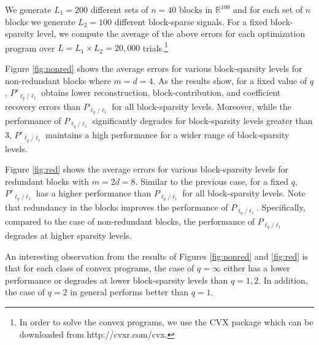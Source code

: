 \documentclass[10pt,twocolumn,twoside] {IEEEtran}
\begin{document}
{We generate $L_1 = 200$ different sets of $n = 40$ blocks in ${\mathbb{R}}^{100}$ and for each set of $n$ blocks we generate $L_2 = 100$ different block-sparse signals. For a fixed block-sparsity level, we compute the average of the above errors for each optimization program over $L = L_1 \times L_2 = 20,000$ trials.\footnote{In order to solve the convex programs, we use the CVX package which can be downloaded from http://cvxr.com/cvx.} 

Figure \ref{fig:nonred} shows the average errors for various block-sparsity levels for non-redundant blocks where $m = d = 4$. As the results show, for a fixed value of $q$, $P'_{\ell_q/\ell_1}$ obtains lower reconstruction, block-contribution, and coefficient recovery errors than $P_{\ell_q/\ell_1}$ for all block-sparsity levels. Moreover, while the performance of $P_{\ell_q/\ell_1}$ significantly degrades for block-sparsity levels greater than $3$, $P'_{\ell_q/\ell_1}$ maintains a high performance for a wider range of block-sparsity levels. 

Figure \ref{fig:red} shows the average errors for various block-sparsity levels for redundant blocks with $m = 2d = 8$. Similar to the previous case, for a fixed $q$, $P'_{\ell_q/\ell_1}$ has a higher performance than $P_{\ell_q/\ell_1}$ for all block-sparsity levels. Note that redundancy in the blocks improves the performance of $P_{\ell_q/\ell_1}$. Specifically, compared to the case of non-redundant blocks, the performance of $P_{\ell_q/\ell_1}$ degrades at higher sparsity levels. 

An interesting observation from the results of Figures \ref{fig:nonred} and \ref{fig:red} is that for each class of convex programs, the case of $q=\infty$ either has a lower performance or degrades at lower block-sparsity levels than $q = 1, 2$. In addition, the case of $q=2$ in general performs better than $q=1$.

}
\end{document}
